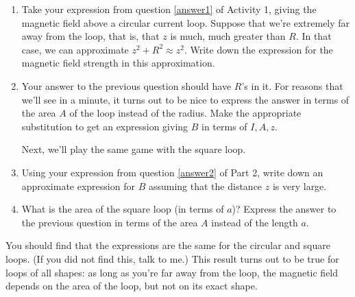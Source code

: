 \begin{enumerate}[wide, label=(\emph{\alph*})]

\item Take your expression from question \ref{answer1} of Activity 1,
giving the magnetic field above a circular current loop.
Suppose that we're extremely far away from the loop, that is,
that $z$ is much, much greater than $R$.  In that case, we can approximate
$z^2+R^2\approx z^2$.  Write down the expression for the magnetic
field strength in this approximation.  
\answerspace{0.7in}

\item Your answer to the previous question should have $R$'s in it.
For reasons that we'll see in a minute, it turns out to be nice
to express the answer in terms of the area $A$ of the loop instead of the
radius.  Make the appropriate substitution to get an expression
giving $B$ in terms of $I,A,z$.
\answerspace{0.7in}

Next, we'll play the same game with the square loop.  

\item Using your expression from question \ref{answer2} of Part 2,
write down an approximate expression for $B$ assuming that the distance
$z$ is very large.
\answerspace{0.7in}

\item What is the area of the square loop (in terms of $a$)?  
Express the answer to the previous question in terms of the area $A$
instead of the length $a$.
\answerspace{0.7in}

\end{enumerate}

You should find that the expressions are the same for the circular
and square loops.  (If you did not find this, talk to me.)
This result turns out to be true for loops of all shapes: as long as you're
far away from the loop, the magnetic field depends on the area of the loop,
but not on its exact shape.


